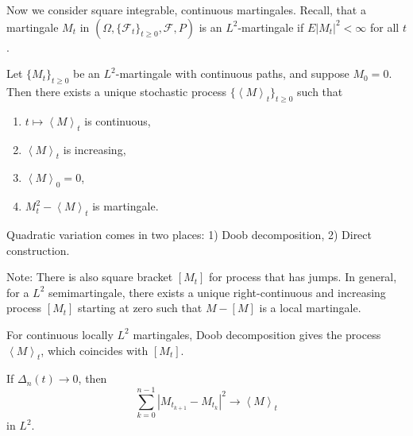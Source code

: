 Now we consider square integrable, continuous martingales. 
Recall, that a martingale $M_t$ in $(\Omega, \{\mathcal{F}_t\} _{t \ge 0}, \mathcal{F}, P)$ is an $L^2  $-martingale if $E|M_t|^2 < \infty $ for all $t$.

\begin{theorem}
	Let $\{M_t\} _{t \ge 0}$ be an $L^2$-martingale with continuous paths, and suppose $M_0 = 0$. Then there exists a unique stochastic process $\{\left\langle M \right\rangle _t\} _{t \ge 0}$ such that
	\begin{enumerate}
		\item  $t \mapsto \left\langle M \right\rangle _t$ is continuous,
		\item $\left\langle M \right\rangle _t$ is increasing,
		\item $\left\langle M \right\rangle _0 = 0$,
		\item $M_t^2 - \left\langle M \right\rangle _t$ is martingale.
	\end{enumerate}
\end{theorem}

\begin{remark}
Quadratic variation comes in two places: 1) Doob decomposition, 2) Direct construction.

Note: There is also square bracket $[M_t]$ for process that has jumps. In general, for a $L^2$ semimartingale, there exists a unique right-continuous and increasing process $\left[ M_t \right] $ starting at zero such that $M - [M]$ is a local martingale.

For continuous locally $L^2$ martingales, Doob decomposition gives the process $\left\langle M \right\rangle _t$, which coincides with $[M_t]$.
\end{remark}

\begin{fact}
	If $\Delta_n(t) \to 0$, then
	\[
		\sum_{k = 0}^{n - 1} \left| M_{t_{k+1}} - M_{t_k} \right| ^2 \to \left\langle M \right\rangle _t
	\] 
	in $L^2$.
\end{fact}





